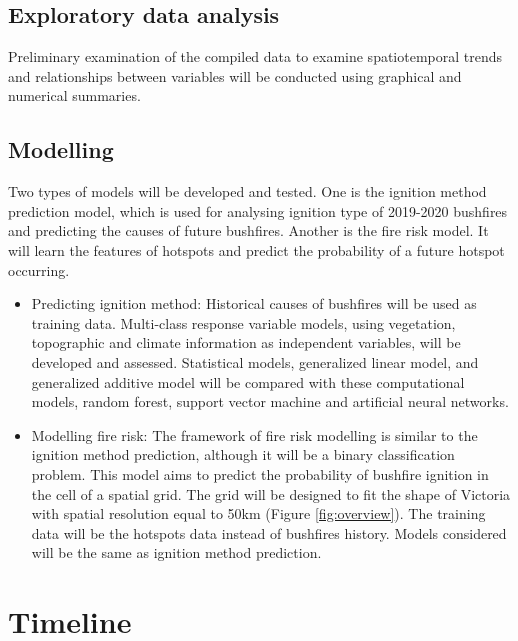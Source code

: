 \documentclass[11pt,a4paper,]{article}
\begin{document}
\hypertarget{exploratory-data-analysis}{%
\subsection{Exploratory data analysis}\label{exploratory-data-analysis}}

Preliminary examination of the compiled data to examine spatiotemporal trends and relationships between variables will be conducted using graphical and numerical summaries.

\hypertarget{modelling}{%
\subsection{Modelling}\label{modelling}}

Two types of models will be developed and tested. One is the ignition method prediction model, which is used for analysing ignition type of 2019-2020 bushfires and predicting the causes of future bushfires. Another is the fire risk model. It will learn the features of hotspots and predict the probability of a future hotspot occurring.

\begin{itemize}
\item
  Predicting ignition method: Historical causes of bushfires will be used as training data. Multi-class response variable models, using vegetation, topographic and climate information as independent variables, will be developed and assessed. Statistical models, generalized linear model, and generalized additive model will be compared with these computational models, random forest, support vector machine and artificial neural networks.
\item
  Modelling fire risk: The framework of fire risk modelling is similar to the ignition method prediction, although it will be a binary classification problem. This model aims to predict the probability of bushfire ignition in the cell of a spatial grid. The grid will be designed to fit the shape of Victoria with spatial resolution equal to 50km (Figure \ref{fig:overview}). The training data will be the hotspots data instead of bushfires history. Models considered will be the same as ignition method prediction.
\end{itemize}

\hypertarget{timeline}{%
\section{Timeline}\label{timeline}}
\end{document}
